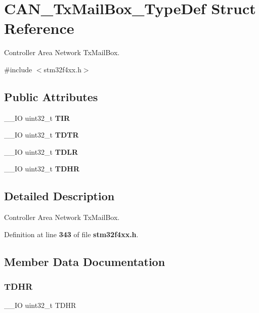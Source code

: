\section{C\+A\+N\+\_\+\+Tx\+Mail\+Box\+\_\+\+Type\+Def Struct Reference}
\label{structCAN__TxMailBox__TypeDef}


Controller Area Network Tx\+Mail\+Box.  




{\ttfamily \#include $<$stm32f4xx.\+h$>$}

\subsection*{Public Attributes}
\begin{DoxyCompactItemize}
\item 
\+\_\+\+\_\+\+IO uint32\+\_\+t \textbf{ T\+IR}
\item 
\+\_\+\+\_\+\+IO uint32\+\_\+t \textbf{ T\+D\+TR}
\item 
\+\_\+\+\_\+\+IO uint32\+\_\+t \textbf{ T\+D\+LR}
\item 
\+\_\+\+\_\+\+IO uint32\+\_\+t \textbf{ T\+D\+HR}
\end{DoxyCompactItemize}


\subsection{Detailed Description}
Controller Area Network Tx\+Mail\+Box. 

Definition at line \textbf{ 343} of file \textbf{ stm32f4xx.\+h}.



\subsection{Member Data Documentation}
\mbox{\label{structCAN__TxMailBox__TypeDef_a90f7c1cf22683459c632d6040366eddf}} 
\subsubsection{T\+D\+HR}
{\footnotesize\ttfamily \+\_\+\+\_\+\+IO uint32\+\_\+t T\+D\+HR}

